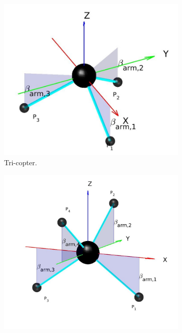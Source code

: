 \begin{figure}[!ht]
  \begin{subfigure}[b]{0.5\textwidth}
    \includegraphics[width=\linewidth]{images/Tricopter.jpg}
    \caption{Tri-copter.} \label{fig:comp_tri}
  \end{subfigure}
  \hspace*{\fill} %
  \begin{subfigure}[b]{0.5\textwidth}
    \includegraphics[width=\linewidth]{images/Quadcopter.jpg}

\end{subfigure}
\end{figure}
